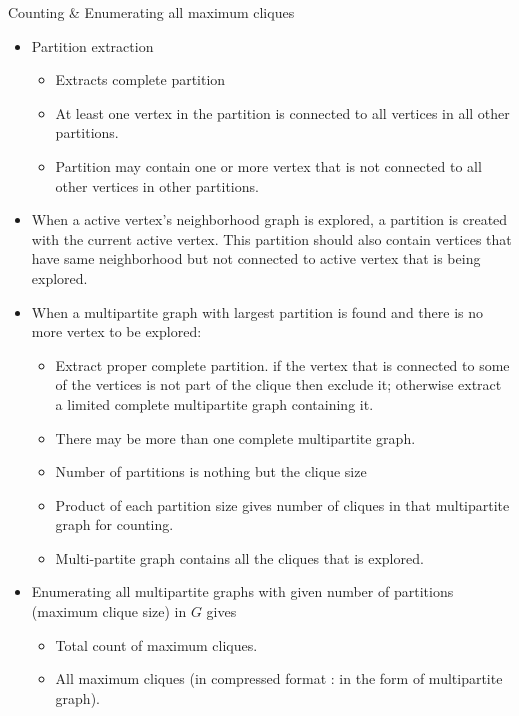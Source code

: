 \documentclass[landscape]{slides}
\begin{document}
\begin{slide}
	\begin{center}
		{\large Counting \& Enumerating all maximum cliques}
	\end{center}
	\begin{itemize}
		\setlength{\itemsep}{0pt}
		\setlength{\parskip}{5pt}
		\setlength{\parsep}{0pt}
		\item Partition extraction
		\begin{itemize}
			\setlength{\itemsep}{0pt}
			\setlength{\parskip}{5pt}
			\setlength{\parsep}{0pt}
			\item Extracts complete partition
			\item At least one vertex in the partition is connected to all vertices in all other partitions.
			\item Partition may contain one or more vertex that is not connected to all other vertices in other partitions.
		\end{itemize}
		\item When a active vertex's neighborhood graph is explored, a partition is created with the current active vertex. This partition should also contain vertices that have same neighborhood but not connected to active vertex that is being explored.
		\item When a multipartite graph with largest partition is found and there is no more vertex to be explored:
		\begin{itemize}
			\setlength{\itemsep}{0pt}
			\setlength{\parskip}{5pt}
			\setlength{\parsep}{0pt}
			\item Extract proper complete partition. if the vertex that is connected to some of the vertices is not part of the clique then exclude it; otherwise extract a limited complete multipartite graph containing it.
			\item There may be more than one complete multipartite graph.
			\item Number of partitions is nothing but the clique size
			\item Product of each partition size gives number of cliques in that multipartite graph for counting.
			\item Multi-partite graph contains all the cliques that is explored.
		\end{itemize}
		\item Enumerating all multipartite graphs with given number of partitions (maximum clique size) in $G$ gives
			\begin{itemize}
				\setlength{\itemsep}{0pt}
				\setlength{\parskip}{5pt}
				\setlength{\parsep}{0pt}
				\item Total count of maximum cliques.
				\item All maximum cliques (in compressed format : in the form of multipartite graph).
			\end{itemize}
	\end{itemize}
\end{slide}
\end{document}
